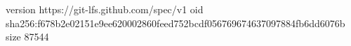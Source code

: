 version https://git-lfs.github.com/spec/v1
oid sha256:f678b2e02151e9ee620002860feed752bcdf056769674637097884fb6dd6076b
size 87544
